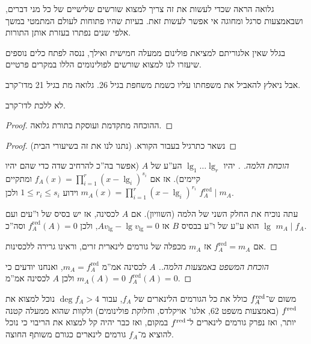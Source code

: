 \documentclass[name=רשימות אלגברה לינארית 2א]{../../../tex/classes/megasumPreamble}
\begin{document}
	גלואה הראה שכדי לעשות את זה צריך למצוא שורשים שלישיים של כל מני דברים, ושבאמצעות סרגל ומחוגה אי אפשר לעשות זאת. בעיות שהיו פתוחות לעולם המתמטי במשך אלפי שנים נפתרו בעזרת אותן התורות. 
	
	בגלל שאין אלגוריתם למציאת פולינום ממעלה חמישית ואילך, ננסה לפתח כלים נוספים שיעזרו לנו למצוא שורשים לפולינומים הללו במקרים פרטיים. 
	
	אבל ניאלץ להאביל את משפחתו עליו  כשמת משחפת בגיל 26. גלואה מת בגיל 21 מדו־קרב. 
	\begin{Collary}
		לא ללכת לדו־קרב. 
	\end{Collary}
	\begin{proof}
		ההוכחה מתקדמת ועוסקת בתורת גלואה. 
	\end{proof}
	
	
	\theo{
	\[ f^{\mathrm{red}} = \frac{f}{\gcd(f, f')} \]}
	\begin{proof}
		נשאר כתרגיל בעבור הקורא. (נתנו לנו את זה בשיעורי הבית)
	\end{proof}
	
	
	
	\begin{proof}[הוכחת הלמה. ]
		יהיו $\lg_1 \dots \lg_r$ הע''ע של $A$ (אפשר בה''כ להרחיב שדה כדי שהם יהיו קיימים). אז אם $f_A(x) = \prod_{i = 1}^{r}(x - \lg_i)^{s_i}$ ומתקיים $m_A(x) = \prod_{i = 1}^{r}(x - \lg_i)^{r_i}$ וידוע $1 \le r_i \le s_i$ ולכן $f_A^{\mathrm{red}} \mid m_A$. 
		
		עתה נוכיח את החלק השני של הלמה (השוויון). אם $A$ לכסינה, אז יש בסיס של ו''עים ועם $\lg$ הוא ע''ע של ו''ע בבסיס $B$ אז $Av_\lg - \lg v_\lg = 0$, ולכן $f_A^{\mathrm{red}}(A) = 0$ וסה''כ $m_A \mid f_A$. 
		
		אם $f_A^{\mathrm{red}} = m_A$ אז $m_A$ מכפלה של גורמים לינארית זרים, וראינו גרירה ללכסינות. 
	\end{proof}
	
	\begin{proof}[הוכחת המשפט באמצעות הלמה.]
		$A$ לכסינה אמ''מ $m_A = f_A^{\mathrm{red}}$, ואנחנו יודעים כי $m_A(A) = 0$ ולכן $A$ לכסינה אמ''מ $f_A^{\mathrm{red}}(A) = 0$. 
	\end{proof}
	משום ש־$f^{\mathrm{red}}_A$ כולל את כל הגורמים הלינארים של $f_A$, עבור $\deg f_A > 4$ נוכל למצוא את $f^{\mathrm{red}}$ (באמצעות משפט 62, אלגו' אויקלדס, וחלוקת פולינומים) ולקוות שהוא ממעלה קטנה יותר, ואז נפרק גורמים לינארים ל־$f^{\mathrm{red}}$ במקום, ואז כבר יהיה קל למצוא את הריבוי כי נוכל להוציא מ־$f_A$ גורמים לינארים כגורם משותף החוצה. 
	
\end{document}
